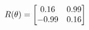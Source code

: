 \documentclass[preview]{standalone}
\begin{document}
\begin{align*}
\special{dvisvgm:raw <g id='unique000'>}R(\theta) = \begin{bmatrix}0.16 & 0.99\\-0.99 & 0.16\end{bmatrix}\special{dvisvgm:raw </g>}
\end{align*}
\end{document}
